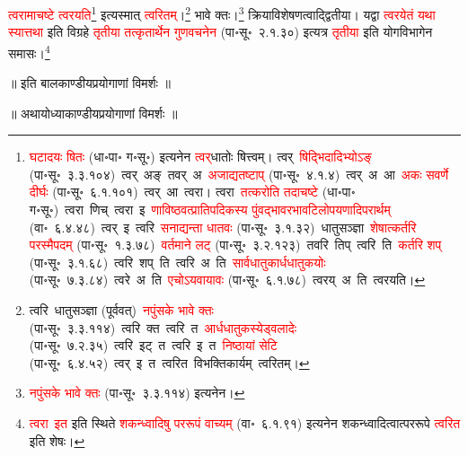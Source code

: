\begin{sloppypar}
\textcolor{red}{त्वरामाचष्टे त्वरयति}\footnote{\textcolor{red}{घटादयः षितः} (धा॰पा॰ ग॰सू॰) इत्यनेन \textcolor{red}{त्वर्‌}\-धातोः षित्त्वम्। त्वर्~\arrow \textcolor{red}{षिद्भिदादिभ्योऽङ्} (पा॰सू॰~३.३.१०४)~\arrow त्वर्~अङ्~\arrow तवर्~अ~\arrow \textcolor{red}{अजाद्यतष्टाप्‌} (पा॰सू॰~४.१.४)~\arrow त्वर्~अ~आ~\arrow \textcolor{red}{अकः सवर्णे दीर्घः} (पा॰सू॰~६.१.१०१)~\arrow त्वर्~आ~\arrow त्वरा। त्वरा~\arrow \textcolor{red}{तत्करोति तदाचष्टे} (धा॰पा॰ ग॰सू॰)~\arrow त्वरा~णिच्~\arrow त्वरा~इ~\arrow \textcolor{red}{णाविष्ठवत्प्राति\-पदिकस्य पुंवद्भाव\-रभाव\-टिलोप\-यणादि\-परार्थम्} (वा॰~६.४.४८)~\arrow त्वर्~इ~\arrow त्वरि~\arrow \textcolor{red}{सनाद्यन्ता धातवः} (पा॰सू॰~३.१.३२)~\arrow धातु\-सञ्ज्ञा~\arrow \textcolor{red}{शेषात्कर्तरि परस्मैपदम्} (पा॰सू॰~१.३.७८)~\arrow \textcolor{red}{वर्तमाने लट्} (पा॰सू॰~३.२.१२३)~\arrow तवरि~तिप्~\arrow त्वरि~ति~\arrow \textcolor{red}{कर्तरि शप्‌} (पा॰सू॰~३.१.६८)~\arrow त्वरि~शप्~ति~\arrow त्वरि~अ~ति~\arrow \textcolor{red}{सार्वधातुकार्ध\-धातुकयोः} (पा॰सू॰~७.३.८४)~\arrow त्वरे~अ~ति~\arrow \textcolor{red}{एचोऽयवायावः} (पा॰सू॰~६.१.७८)~\arrow त्वरय्~अ~ति~\arrow त्वरयति।} इत्यस्मात् \textcolor{red}{त्वरितम्}।\footnote{त्वरि~\arrow धातु\-सञ्ज्ञा (पूर्ववत्)~\arrow \textcolor{red}{नपुंसके भावे क्तः} (पा॰सू॰~३.३.११४)~\arrow त्वरि~क्त~\arrow त्वरि~त~\arrow \textcolor{red}{आर्धधातुकस्येड्वलादेः} (पा॰सू॰~७.२.३५)~\arrow त्वरि~इट्~त~\arrow त्वरि~इ~त~\arrow \textcolor{red}{निष्ठायां सेटि} (पा॰सू॰~६.४.५२)~\arrow त्वर्~इ~त~\arrow त्वरित~\arrow विभक्तिकार्यम्~\arrow त्वरितम्।} भावे क्तः।\footnote{\textcolor{red}{नपुंसके भावे क्तः} (पा॰सू॰~३.३.११४) इत्यनेन।} क्रिया\-विशेषणत्वाद्द्वितीया। यद्वा \textcolor{red}{त्वरयेतं यथा स्यात्तथा} इति विग्रहे \textcolor{red}{तृतीया तत्कृतार्थेन गुण\-वचनेन} (पा॰सू॰~२.१.३०) इत्यत्र \textcolor{red}{तृतीया} इति योग\-विभागेन समासः।\footnote{\textcolor{red}{त्वरा~इत} इति स्थिते \textcolor{red}{शकन्ध्वादिषु पर\-रूपं वाच्यम्} (वा॰~६.१.९१) इत्यनेन शकन्ध्वादित्वात्पर\-रूपे \textcolor{red}{त्वरित} इति शेषः।
}\end{sloppypar}
\vspace{2mm}
\centering ॥ इति बालकाण्डीयप्रयोगाणां विमर्शः ॥\nopagebreak\\
\vspace{4mm}
{}
\centering ॥ अथायोध्याकाण्डीयप्रयोगाणां विमर्शः ॥\nopagebreak\\
